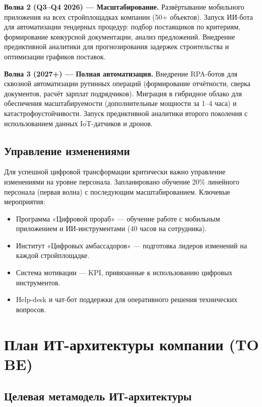 \documentclass[12pt,a4paper]{article}
\begin{document}
\textbf{Волна 2 (Q3--Q4 2026) --- Масштабирование.} Развёртывание мобильного приложения на всех стройплощадках компании (50+ объектов). Запуск ИИ-бота для автоматизации тендерных процедур: подбор поставщиков по критериям, формирование конкурсной документации, анализ предложений. Внедрение предиктивной аналитики для прогнозирования задержек строительства и оптимизации графиков поставок.

\textbf{Волна 3 (2027+) --- Полная автоматизация.} Внедрение RPA-ботов для сквозной автоматизации рутинных операций (формирование отчётности, сверка документов, расчёт зарплат подрядчиков). Миграция в гибридное облако для обеспечения масштабируемости (дополнительные мощности за 1--4 часа) и катастрофоустойчивости. Запуск предиктивной аналитики второго поколения с использованием данных IoT-датчиков и дронов.

\subsection{Управление изменениями}

Для успешной цифровой трансформации критически важно управление изменениями на уровне персонала. Запланировано обучение 20\% линейного персонала (первая волна) с последующим масштабированием. Ключевые мероприятия:

\begin{itemize}[leftmargin=20pt]
  \item Программа «Цифровой прораб» --- обучение работе с мобильным приложением и ИИ-инструментами (40 часов на сотрудника).
  \item Институт «Цифровых амбассадоров» --- подготовка лидеров изменений на каждой стройплощадке.
  \item Система мотивации --- KPI, привязанные к использованию цифровых инструментов.
  \item Help-desk и чат-бот поддержки для оперативного решения технических вопросов.
\end{itemize}

\newpage

\section{План ИТ-архитектуры компании (TO BE)}

\subsection{Целевая метамодель ИТ-архитектуры}
\end{document}
